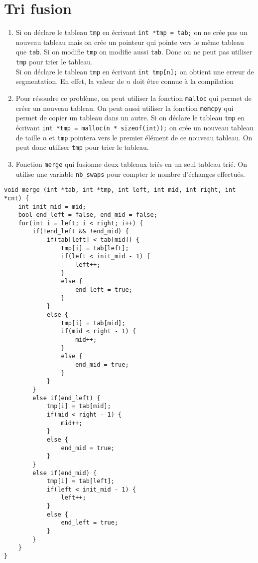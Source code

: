 \documentclass[12pt]{article}
\begin{document}
\section{Tri fusion}
\begin{enumerate}
    \item Si on déclare le tableau \texttt{tmp} en écrivant \texttt{int *tmp = tab;} on ne crée pas un nouveau tableau mais on crée un pointeur qui pointe vers le même tableau que \texttt{tab}. Si on modifie \texttt{tmp} on modifie aussi \texttt{tab}. Donc on ne peut pas utiliser \texttt{tmp} pour trier le tableau. \\
    Si on déclare le tableau \texttt{tmp} en écrivant \texttt{int tmp[n];} on obtient une erreur de segmentation. En effet, la valeur de $n$ doit être connue à la compilation \\
    \item Pour résoudre ce problème, on peut utiliser la fonction \texttt{malloc} qui permet de créer un nouveau tableau. On peut aussi utiliser la fonction \texttt{memcpy} qui permet de copier un tableau dans un autre. Si on déclare le tableau \texttt{tmp} en écrivant \texttt{int *tmp = malloc(n * sizeof(int));} on crée un nouveau tableau de taille $n$ et \texttt{tmp} pointera vers le premier élément de ce nouveau tableau. On peut donc utiliser \texttt{tmp} pour trier le tableau. 
    \item Fonction \texttt{merge} qui fusionne deux tableaux triés en un seul tableau trié. On utilise une variable \texttt{nb\_swaps} pour compter le nombre d'échanges effectués.
\end{enumerate}
\begin{lstlisting}[style=languageClarge, caption=Implémentation de la fonction \texttt{merge}]
void merge (int *tab, int *tmp, int left, int mid, int right, int *cnt) {
    int init_mid = mid;
    bool end_left = false, end_mid = false;
    for(int i = left; i < right; i++) {
        if(!end_left && !end_mid) {
            if(tab[left] < tab[mid]) {
                tmp[i] = tab[left];
                if(left < init_mid - 1) {
                    left++;
                }
                else {
                    end_left = true;
                }
            }
            else {
                tmp[i] = tab[mid];
                if(mid < right - 1) {
                    mid++;
                }
                else {
                    end_mid = true;
                }
            }
        }
        else if(end_left) {
            tmp[i] = tab[mid];
            if(mid < right - 1) {
                mid++;
            }
            else {
                end_mid = true;
            }
        }
        else if(end_mid) {
            tmp[i] = tab[left];
            if(left < init_mid - 1) {
                left++;
            }
            else {
                end_left = true;
            }
        }
    }
}
\end{lstlisting}
\end{document}
